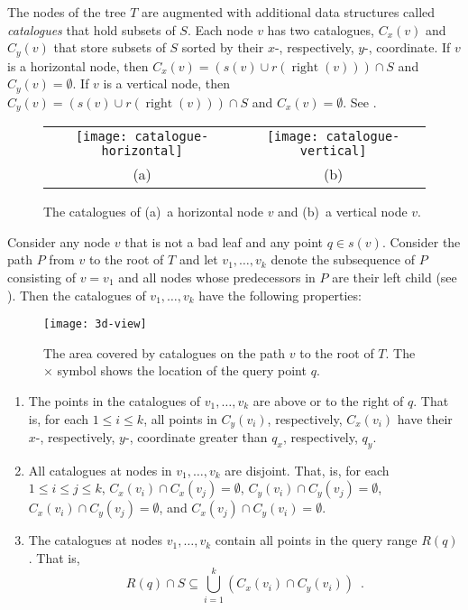\documentclass[lotsofwhite,charterfonts]{patmorin}
\DeclareMathOperator{\rght}{right}
\begin{document}
The nodes of the tree $T$ are augmented with additional data
structures called \emph{catalogues} that hold subsets of $S$.  Each
node $v$ has two catalogues, $C_x(v)$ and $C_y(v)$ that store subsets
of $S$ sorted by their $x$-, respectively, $y$-, coordinate.  If $v$
is a horizontal node, then $C_x(v)= (s(v)\cup r(\rght(v)))\cap S$ and
$C_y(v)=\emptyset$.  If $v$ is a vertical node, then $C_y(v) =
(s(v)\cup r(\rght(v)))\cap S$ and $C_x(v)=\emptyset$. See
.

\begin{figure}
  \begin{center}
    \begin{tabular}{c|c}
      \texttt{[image: catalogue-horizontal]} &
        \texttt{[image: catalogue-vertical]} \\
       (a) & (b) 
    \end{tabular}
  \end{center}
  \caption{The catalogues of (a)~a horizontal node $v$ and (b)~a
  vertical node $v$.}
\end{figure}

Consider any node $v$ that is not a bad leaf and any point $q\in
s(v)$.  Consider the path $P$ from $v$ to the root of
$T$ and let $v_1,\ldots,v_k$ denote the subsequence of $P$ consisting of
$v=v_1$ and all nodes whose predecessors in $P$ are their left child
(see ).
Then the catalogues of $v_1,\ldots,v_k$ have the
following properties:
\begin{figure}
  \begin{center}
    \texttt{[image: 3d-view]}
  \end{center}
  \caption{The area covered by catalogues on the path $v$ to the root
of $T$. The $\times$ symbol shows the location of the query point $q$.}
\end{figure}

\begin{enumerate}

\item The points in the catalogues of $v_1,\ldots,v_k$ are above or to
the right of $q$.  That is, for each $1\le i \le k$, all points in
$C_y(v_i)$, respectively, $C_x(v_i)$ have their $x$-, respectively,
$y$-, coordinate greater than $q_x$, respectively, $q_y$.

\item All catalogues at nodes in $v_1,\ldots,v_k$ are disjoint.  That,
is, for each $1\le i\le j \le k$,
$C_x(v_i)\cap C_x(v_j) = \emptyset$,
$C_y(v_i)\cap C_y(v_j) = \emptyset$,
$C_x(v_i)\cap C_y(v_j) = \emptyset$, and
$C_x(v_j)\cap C_y(v_i) = \emptyset$.

\item The catalogues at nodes $v_1,\ldots,v_k$ contain all points in
the query range $R(q)$.  That is,
\[
     R(q)\cap S \subseteq \bigcup_{i=1}^k \left(C_x(v_i)\cap C_y(v_i)\right)
        \enspace . 
\]
\end{enumerate}
\end{document}
